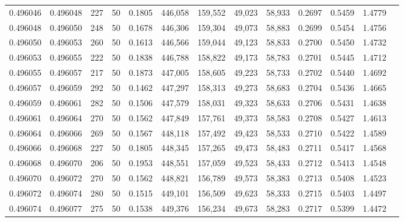 \begin{tabular}{rrrrrrrrrrrrr}
0.496046 & 0.496048 &   227 &  50 &                                     0.1805 & 446,058 & 159,552 &  49,023 &  58,933 & 0.2697 & 0.5459 & 1.4779 \\
0.496048 & 0.496050 &   248 &  50 &                                     0.1678 & 446,306 & 159,304 &  49,073 &  58,883 & 0.2699 & 0.5454 & 1.4756 \\
0.496050 & 0.496053 &   260 &  50 &                                     0.1613 & 446,566 & 159,044 &  49,123 &  58,833 & 0.2700 & 0.5450 & 1.4732 \\
0.496053 & 0.496055 &   222 &  50 &                                     0.1838 & 446,788 & 158,822 &  49,173 &  58,783 & 0.2701 & 0.5445 & 1.4712 \\
0.496055 & 0.496057 &   217 &  50 &                                     0.1873 & 447,005 & 158,605 &  49,223 &  58,733 & 0.2702 & 0.5440 & 1.4692 \\
0.496057 & 0.496059 &   292 &  50 &                                     0.1462 & 447,297 & 158,313 &  49,273 &  58,683 & 0.2704 & 0.5436 & 1.4665 \\
0.496059 & 0.496061 &   282 &  50 &                                     0.1506 & 447,579 & 158,031 &  49,323 &  58,633 & 0.2706 & 0.5431 & 1.4638 \\
0.496061 & 0.496064 &   270 &  50 &                                     0.1562 & 447,849 & 157,761 &  49,373 &  58,583 & 0.2708 & 0.5427 & 1.4613 \\
0.496064 & 0.496066 &   269 &  50 &                                     0.1567 & 448,118 & 157,492 &  49,423 &  58,533 & 0.2710 & 0.5422 & 1.4589 \\
0.496066 & 0.496068 &   227 &  50 &                                     0.1805 & 448,345 & 157,265 &  49,473 &  58,483 & 0.2711 & 0.5417 & 1.4568 \\
0.496068 & 0.496070 &   206 &  50 &                                     0.1953 & 448,551 & 157,059 &  49,523 &  58,433 & 0.2712 & 0.5413 & 1.4548 \\
0.496070 & 0.496072 &   270 &  50 &                                     0.1562 & 448,821 & 156,789 &  49,573 &  58,383 & 0.2713 & 0.5408 & 1.4523 \\
0.496072 & 0.496074 &   280 &  50 &                                     0.1515 & 449,101 & 156,509 &  49,623 &  58,333 & 0.2715 & 0.5403 & 1.4497 \\
0.496074 & 0.496077 &   275 &  50 &                                     0.1538 & 449,376 & 156,234 &  49,673 &  58,283 & 0.2717 & 0.5399 & 1.4472 \\

\end{tabular}
